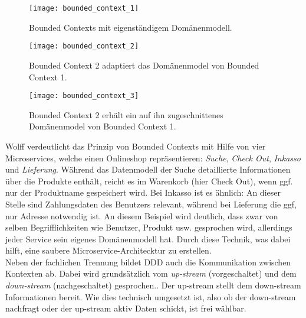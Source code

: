 \begin{figure}[ht]
	\centering
	\texttt{[image: bounded\_context\_1]}
	\caption[Bounded Contexts mit eigenständigem Domänenmodel] {Bounded Contexts mit eigenständigem Domänenmodell.\cite{wolff2018mic_praxis}}
	\label{fig:bounded_context_with_own_datamodels}
\end{figure}

\begin{figure}[ht]
	\centering
	\texttt{[image: bounded\_context\_2]}
	\caption[Bounded Context 2 adaptiert das Domänenmodel von Bounded Context 1] {Bounded Context 2 adaptiert das Domänenmodel von Bounded Context 1.\cite{wolff2018mic_praxis}}
	\label{fig:bounded_context_with_copied_datamodel}
\end{figure}

\begin{figure}[ht]
	\centering
	\texttt{[image: bounded\_context\_3]}
	\caption[Bounded Context 2 erhält ein auf ihn zugeschnittenes Domänenmodel von Bounded Context 1] {Bounded Context 2 erhält ein auf ihn zugeschnittenes Domänenmodel von Bounded Context 1.\cite{wolff2018mic_praxis}}
	\label{fig:bounded_context_with_custom_datamodels}
\end{figure}

Wolff verdeutlicht das Prinzip von Bounded Contexts mit Hilfe von vier Microservices, welche einen Onlineshop repräsentieren: \textit{Suche}, \textit{Check Out}, \textit{Inkasso} und \textit{Lieferung}. Während das Datenmodell der Suche detaillierte Informationen über die Produkte enthält, reicht es im Warenkorb (hier Check Out), wenn ggf. nur der Produktname gespeichert wird. Bei Inkasso ist es ähnlich: An dieser Stelle sind Zahlungsdaten des Benutzers relevant, während bei Lieferung die ggf, nur Adresse notwendig ist.\cite{wolff2018mic_praxis} An diesem Beispiel wird deutlich, dass zwar von selben Begrifflichkeiten wie Benutzer, Produkt usw. gesprochen wird, allerdings jeder Service sein eigenes Domänenmodell hat. Durch diese Technik, was dabei hilft, eine saubere Microservice-Architecktur zu erstellen.\cite{wolff2018mic_praxis} \cite{heise2016ddd} \\

Neben der fachlichen Trennung bildet DDD auch die Kommunikation zwischen Kontexten ab. Dabei wird grundsätzlich vom \textit{up-stream} (vorgeschaltet) und dem \textit{down-stream} (nachgeschaltet) gesprochen.\cite{wolff2018mic_praxis}. Der up-stream stellt dem down-stream Informationen bereit. Wie dies technisch umgesetzt ist, also ob der down-stream nachfragt oder der up-stream aktiv Daten schickt, ist frei wählbar. \\


